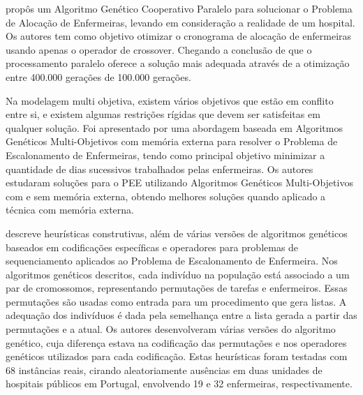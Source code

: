 \cite{ohki:2008} propôs um Algoritmo Genético Cooperativo Paralelo para solucionar o Problema de Alocação de Enfermeiras, levando em consideração a realidade de um hospital. Os autores tem como objetivo otimizar o cronograma de alocação de enfermeiras usando apenas o operador de crossover. Chegando a conclusão de que o processamento paralelo oferece a solução mais adequada através de a otimização entre 400.000 gerações de 100.000 gerações.

Na modelagem multi objetiva, existem vários objetivos que estão em conflito entre si, e existem algumas restrições rígidas que devem ser satisfeitas em qualquer solução. Foi apresentado por\cite{ahmet:2009} uma abordagem baseada em Algoritmos Genéticos Multi-Objetivos com memória externa para resolver o Problema de Escalonamento de Enfermeiras, tendo como principal objetivo minimizar a quantidade de dias sucessivos trabalhados pelas enfermeiras. Os autores estudaram soluções para o \ac{PEE} utilizando Algoritmos Genéticos Multi-Objetivos com e sem memória externa, obtendo melhores soluções quando aplicado a técnica com memória externa. 

\cite{mozab:2007} descreve  heurísticas construtivas, além de várias versões de algoritmos genéticos baseados em codificações específicas e operadores para problemas de sequenciamento aplicados ao Problema de Escalonamento de Enfermeira. Nos algoritmos genéticos descritos, cada indivíduo na população está associado a um par de cromossomos, representando permutações de tarefas e enfermeiros. Essas permutações são usadas como entrada para um procedimento que gera listas. A adequação dos indivíduos é dada pela semelhança entre a lista gerada a partir das permutações e a atual. Os autores desenvolveram várias versões do algoritmo genético, cuja diferença estava na codificação das permutações e nos operadores genéticos utilizados para cada codificação. Estas heurísticas foram testadas com 68 instâncias reais,  cirando aleatoriamente ausências em duas unidades de hospitais públicos em Portugal, envolvendo 19 e 32 enfermeiras, respectivamente.

